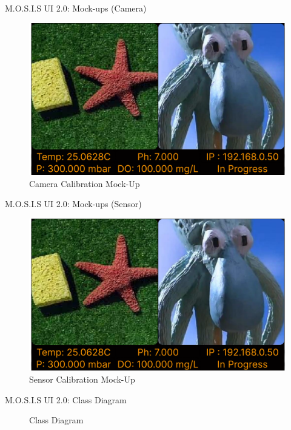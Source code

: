 \documentclass[17pt, aspectratio=169]{beamer}
\begin{document}
\begin{frame}{M.O.S.I.S UI 2.0: Mock-ups (Camera)}
	\begin{figure}
		\includegraphics[page=3,height=0.65\textheight]{../../Progress_Report_Document/Appendix/Design_Documentation/User_Interface/Figures/M.O.S.I.S_UI_Design.pdf}
		\caption{Camera Calibration Mock-Up}
	\end{figure}
\end{frame}
\begin{frame}{M.O.S.I.S UI 2.0: Mock-ups (Sensor)}
	\begin{figure}
		\includegraphics[page=7,height=0.65\textheight]{../../Progress_Report_Document/Appendix/Design_Documentation/User_Interface/Figures/M.O.S.I.S_UI_Design.pdf}
		\caption{Sensor Calibration Mock-Up}
	\end{figure}
\end{frame}
\begin{frame}{M.O.S.I.S UI 2.0: Class Diagram}
	\begin{figure}
		\caption{Class Diagram}
	\end{figure}
\end{frame}
\end{document}
